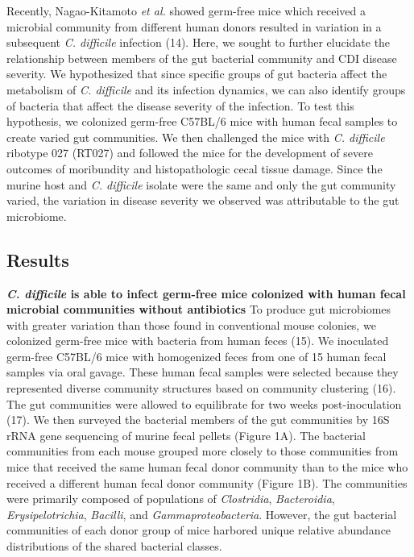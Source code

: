 \documentclass[
  12pt,
]{article}
\begin{document}
Recently, Nagao-Kitamoto \emph{et al.} showed germ-free mice which
received a microbial community from different human donors resulted in
variation in a subsequent \emph{C. difficile} infection (14). Here, we
sought to further elucidate the relationship between members of the gut
bacterial community and CDI disease severity. We hypothesized that since
specific groups of gut bacteria affect the metabolism of \emph{C.
difficile} and its infection dynamics, we can also identify groups of
bacteria that affect the disease severity of the infection. To test this
hypothesis, we colonized germ-free C57BL/6 mice with human fecal samples
to create varied gut communities. We then challenged the mice with
\emph{C. difficile} ribotype 027 (RT027) and followed the mice for the
development of severe outcomes of moribundity and histopathologic cecal
tissue damage. Since the murine host and \emph{C. difficile} isolate
were the same and only the gut community varied, the variation in
disease severity we observed was attributable to the gut microbiome.

\hypertarget{results}{%
\subsection{Results}\label{results}}

\textbf{\emph{C. difficile} is able to infect germ-free mice colonized
with human fecal microbial communities without antibiotics} To produce
gut microbiomes with greater variation than those found in conventional
mouse colonies, we colonized germ-free mice with bacteria from human
feces (15). We inoculated germ-free C57BL/6 mice with homogenized feces
from one of 15 human fecal samples via oral gavage. These human fecal
samples were selected because they represented diverse community
structures based on community clustering (16). The gut communities were
allowed to equilibrate for two weeks post-inoculation (17). We then
surveyed the bacterial members of the gut communities by 16S rRNA gene
sequencing of murine fecal pellets (Figure 1A). The bacterial
communities from each mouse grouped more closely to those communities
from mice that received the same human fecal donor community than to the
mice who received a different human fecal donor community (Figure 1B).
The communities were primarily composed of populations of
\emph{Clostridia}, \emph{Bacteroidia}, \emph{Erysipelotrichia},
\emph{Bacilli}, and \emph{Gammaproteobacteria}. However, the gut
bacterial communities of each donor group of mice harbored unique
relative abundance distributions of the shared bacterial classes.
\end{document}
